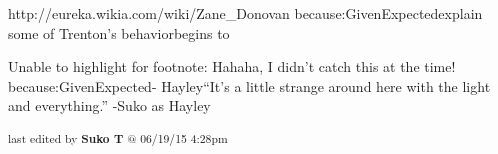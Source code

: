 http://eureka.wikia.com/wiki/Zane_Donovan because:GivenExpectedexplain some of Trenton’s behaviorbegins to

	Unable to highlight for footnote: Hahaha, I didn't catch this at the time! because:GivenExpected- Hayley“It’s a little strange around here with the light and everything.” -Suko as Hayley


\fi

\vspace{\fill}

\begin{flushright}
\textsubscript{last edited by \textbf{Suko T} @ 06/19/15 4:28pm}
\end{flushright}

